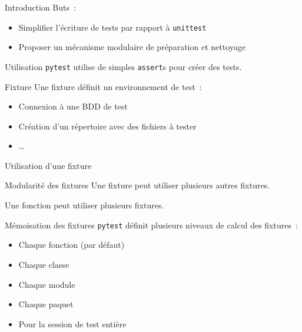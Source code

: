 \begin{frame}{Introduction}
  Buts~:
  \begin{itemize}[<+->]
    \item Simplifier l'écriture de tests par rapport à \texttt{unittest}
    \item Proposer un mécanisme modulaire de préparation et nettoyage
  \end{itemize}
\end{frame}

\begin{frame}{Utilisation}
  \texttt{pytest} utilise de simples \texttt{assert}s pour créer des tests.

\end{frame}

\begin{frame}{Fixture}
  Une fixture définit un environnement de test~:

  \begin{itemize}[<+->]
    \item Connexion à une BDD de test
    \item Création d'un répertoire avec des fichiers à tester
    \item …
  \end{itemize}
\end{frame}

\begin{frame}{Utilisation d'une fixture}
\end{frame}

\begin{frame}{Modularité des fixtures}
  Une fixture peut utiliser plusieurs autres fixtures.

  Une fonction peut utiliser plusieurs fixtures.
\end{frame}

\begin{frame}{Mémoisation des fixtures}
  \texttt{pytest} définit plusieurs niveaux de calcul des fixtures~:

  \begin{itemize}[<+->]
    \item Chaque fonction (par défaut)
    \item Chaque classe
    \item Chaque module
    \item Chaque paquet
    \item Pour la session de test entière
  \end{itemize}
\end{frame}

